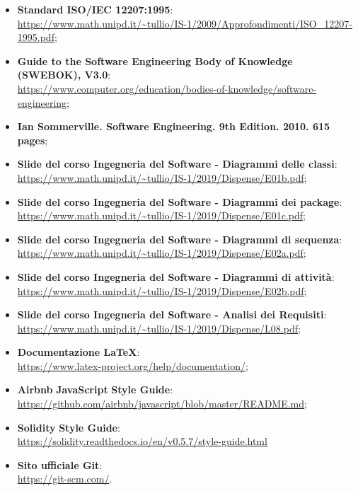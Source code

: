 	\begin{itemize}
		\item \textbf{Standard ISO/IEC 12207:1995}: \\
			\url{https://www.math.unipd.it/~tullio/IS-1/2009/Approfondimenti/ISO_12207-1995.pdf};
	
		\item \textbf{Guide to the Software Engineering Body of Knowledge (SWEBOK), V3.0}:\\
			\url{https://www.computer.org/education/bodies-of-knowledge/software-engineering};
	
		\item \textbf{Ian Sommerville. Software Engineering. 9th Edition. 2010. 615 pages}; 
		
		\item \textbf{Slide del corso Ingegneria del Software - Diagrammi delle classi}: \\
			\url{https://www.math.unipd.it/~tullio/IS-1/2019/Dispense/E01b.pdf};
		
		\item \textbf{Slide del corso Ingegneria del Software - Diagrammi dei package}:\\ 
			\url{https://www.math.unipd.it/~tullio/IS-1/2019/Dispense/E01c.pdf};
		
		\item \textbf{Slide del corso Ingegneria del Software - Diagrammi di sequenza}: \\
			\url{https://www.math.unipd.it/~tullio/IS-1/2019/Dispense/E02a.pdf};
		
		\item \textbf{Slide del corso Ingegneria del Software - Diagrammi di attività}: \\
			\url{https://www.math.unipd.it/~tullio/IS-1/2019/Dispense/E02b.pdf};
			
		\item \textbf{Slide del corso Ingegneria del Software - Analisi dei Requisiti}: \\
			\url{https://www.math.unipd.it/~tullio/IS-1/2019/Dispense/L08.pdf};
		
		\item \textbf{Documentazione \LaTeX{}}: \\
			\url{https://www.latex-project.org/help/documentation/};
	
		\item \textbf{Airbnb} \textbf{JavaScript} \textbf{Style Guide}: \\ 
			\url{https://github.com/airbnb/javascript/blob/master/README.md};
		
		\item \textbf{Solidity} \textbf{Style Guide}: \\
			\url{https://solidity.readthedocs.io/en/v0.5.7/style-guide.html}
	
		\item \textbf{Sito ufficiale Git}: \\
			\url{https://git-scm.com/}.
	\end{itemize}